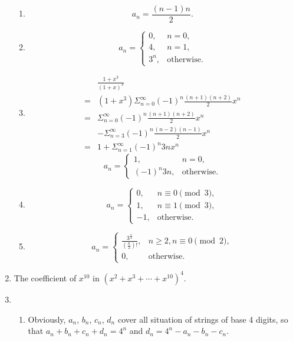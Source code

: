 \documentclass{../../cls/sig-alternate-05-2015}
\begin{document}
\begin{enumerate}
\begin{enumerate}
		\item \begin{equation}
			a_n = \frac{(n - 1)n}{2}.
		\end{equation}
		\item \begin{equation}
			a_n = \begin{cases}
				0, & n = 0,\\
				4, & n = 1,\\
				3^n, & \text{otherwise}.
			\end{cases}
		\end{equation}
		\item \begin{align}
			& \frac{1 + x^3}{(1 + x)^3}\\
			= & (1 + x^3) \Sigma_{n = 0}^\infty (-1)^n \frac{(n + 1)(n + 2)}{2} x^n\\
			= & \Sigma_{n = 0}^\infty (-1)^n \frac{(n + 1)(n + 2)}{2} x^n\\
			& - \Sigma_{n = 3}^\infty (-1)^n \frac{(n - 2)(n - 1)}{2} x^n\\
			= & 1 + \Sigma_{n = 1}^\infty (-1)^n 3n x^n
		\end{align}
		\begin{equation}
			a_n = \begin{cases}
			1, & n = 0,\\
			(-1)^n 3n, & \text{otherwise}.
			\end{cases}
		\end{equation}
		\item \begin{equation}
			a_n = \begin{cases}
				0, & n \equiv 0 \pmod{3},\\
				1, & n \equiv 1 \pmod{3},\\
				-1, & \text{otherwise}.
			\end{cases}
		\end{equation}
		\item \begin{equation}
			a_n = \begin{cases}
				\frac{3^{\frac{n}{2}}}{(\frac{n}{2})!}, & n \ge 2, n \equiv 0 \pmod{2},\\
				0, & \text{otherwise}.
			\end{cases}
		\end{equation}
	\end{enumerate}
	\item The coefficient of $x^{10}$ in $(x^2+x^3+\cdots +x^{10})^4$.
	\item \begin{enumerate}
		\item Obviously, $a_n$, $b_n$, $c_n$, $d_n$ cover all situation of strings of base 4 digits, so that $a_n + b_n + c_n + d_n = 4^n$ and $d_n = 4^n - a_n - b_n - c_n$.
		

\end{enumerate}
\end{enumerate}
\end{document}
